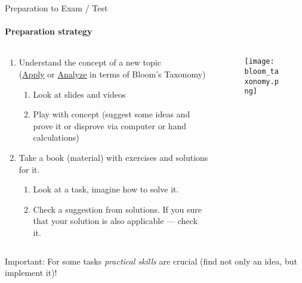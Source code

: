 \documentclass[aspectratio=169]{beamer}
\begin{document}
\begin{frame}[t]{Preparation to Exam / Test}
    \framesubtitle{Preparation strategy}
    \vspace{-0.7cm}
    \begin{columns}[T,onlytextwidth]
        \begin{column}{0.59\textwidth}
            \begin{enumerate}
                \item Understand the concept of a new topic \\ (\underline{Apply} or \underline{Analyze} in terms of Bloom's Taxonomy)
                      \begin{enumerate}
                          \item Look at slides and videos
                          \item Play with concept (suggest some ideas and prove it or disprove via computer or hand calculations)
                      \end{enumerate}
                \item Take a book (material) with exercises and solutions for it. \begin{enumerate}
                          \item Look at a task, imagine how to solve it.
                          \item Check a suggestion from solutions. If you sure that your solution is also applicable --- check it.
                      \end{enumerate}
            \end{enumerate}
        \end{column}
        \begin{column}{0.39\textwidth}
            \begin{figure}[H]
                \centering\texttt{[image: bloom\_taxonomy.png]}
                \label{fig:bloom_taxonomy.png}
            \end{figure}
        \end{column}
    \end{columns}
    {\small \alert{Important}: For some tasks \textit{practical skills} are crucial (find not only an idea, but implement it)!}
\end{frame}
\end{document}
